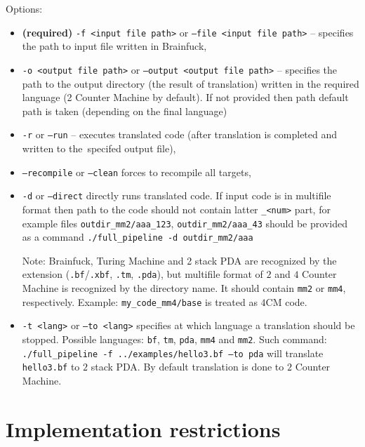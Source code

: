 \documentclass[english,shortabstract,mgr]{iithesis}
\begin{document}
Options:
\begin{itemize}
  \item\textbf{(required)} \texttt{-f <input file path>} or \texttt{--file <input file path>} -- specifies
      the path to input file written in Brainfuck,
  \item \texttt{-o <output file path>} or \texttt{--output <output file path>} -- specifies
      the path to the output directory (the result of translation) written in the required language (2 Counter Machine by default).
      If not provided then path default path is taken (depending on the final language)
  \item \texttt{-r} or \texttt{--run} -- executes translated code (after translation is completed
      and written to the~specifed output file),
  \item \texttt{--recompile} or \texttt{--clean} forces to recompile all targets,
  \item \texttt{-d} or \texttt{--direct} directly runs translated code. If input
      code is in multifile format then path to the code should not contain latter \texttt{\_<num>}
      part, for example files \texttt{outdir\_mm2/aaa\_123}, \texttt{outdir\_mm2/aaa\_43} should
      be provided as a command \texttt{./full\_pipeline -d outdir\_mm2/aaa}

      \begin{footnotesize}
      Note: Brainfuck, Turing Machine and 2 stack PDA are recognized by the extension
      (\texttt{.bf}/\texttt{.xbf}, \texttt{.tm}, \texttt{.pda}), but multifile format of $2$ and $4$ Counter Machine
      is recognized by the directory name. It should contain \texttt{mm2} or
      \texttt{mm4}, respectively. Example: \texttt{my\_code\_mm4/base} is treated as $4$CM code.
      \end{footnotesize}
  \item \texttt{-t <lang>} or \texttt{--to <lang>} specifies at which language a translation should
      be stopped. Possible languages: \texttt{bf}, \texttt{tm}, \texttt{pda}, \texttt{mm4} and \texttt{mm2}.
      Such command: \texttt{./full\_pipeline -f ../examples/hello3.bf --to pda} will translate
      \texttt{hello3.bf} to $2$ stack PDA. By default translation is done to $2$ Counter Machine.
\end{itemize}

\section{Implementation restrictions}
\end{document}
